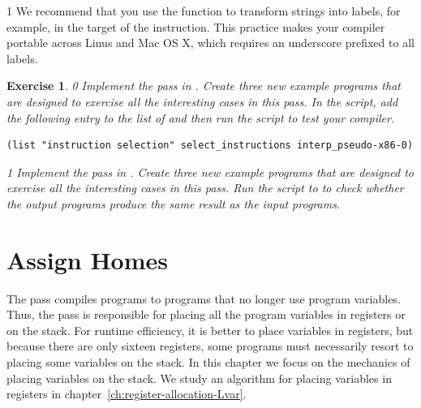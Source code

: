 \documentclass[7x10]{TimesAPriori_MIT}%
\def\racketEd{0}
\def\pythonEd{1}
\def\edition{1}
\newcommand{\pythonColor}[0]{}
\newtheorem{exercise}[theorem]{Exercise}
\numberwithin{theorem}{chapter}
\numberwithin{definition}{chapter}
\numberwithin{equation}{chapter}
\begin{document}
{\if\edition\pythonEd\pythonColor
We recommend that you use the function  to
transform strings into labels, for example, in
the target of the  instruction. This practice makes your
compiler portable across Linus and Mac OS X, which requires an underscore
prefixed to all labels.
\fi}
\begin{exercise}
  \normalfont\normalsize
{\if\edition\racketEd
Implement the  pass in
. Create three new example programs that are
designed to exercise all the interesting cases in this pass.
%
In the  script, add the following entry to the
list of  and then run the script to test your compiler.
\begin{lstlisting}
(list "instruction selection" select_instructions interp_pseudo-x86-0)
\end{lstlisting}
\fi}
{\if\edition\pythonEd\pythonColor
Implement the  pass in
. Create three new example programs that are
designed to exercise all the interesting cases in this pass.
Run the  script to to check
whether the output programs produce the same result as the input
programs.
\fi}
\end{exercise}


\section{Assign Homes}
\label{sec:assign-Lvar}

The  pass compiles \LangXVar{} programs to
\LangXVar{} programs that no longer use program variables.  Thus, the
 pass is responsible for placing all the program
variables in registers or on the stack. For runtime efficiency, it is
better to place variables in registers, but because there are only
sixteen registers, some programs must necessarily resort to placing
some variables on the stack. In this chapter we focus on the mechanics
of placing variables on the stack. We study an algorithm for placing
variables in registers in chapter~\ref{ch:register-allocation-Lvar}.
\end{document}
